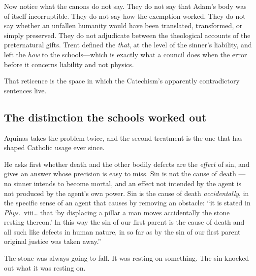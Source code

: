 Now notice what the canons do not say. They do not say that Adam's body was of itself incorruptible. They do not say how the exemption worked. They do not say whether an unfallen humanity would have been translated, transformed, or simply preserved. They do not adjudicate between the theological accounts of the preternatural gifts. Trent defined the \emph{that}, at the level of the sinner's liability, and left the \emph{how} to the schools---which is exactly what a council does when the error before it concerns liability and not physics.

That reticence is the space in which the Catechism's apparently contradictory sentences live.

\subsection{The distinction the schools worked out}

Aquinas takes the problem twice, and the second treatment is the one that has shaped Catholic usage ever since.

He asks first whether death and the other bodily defects are the \emph{effect} of sin, and gives an answer whose precision is easy to miss. Sin is not the cause of death ---no sinner intends to become mortal, and an effect not intended by the agent is not produced by the agent's own power. Sin is the cause of death \emph{accidentally}, in the specific sense of an agent that causes by removing an obstacle: ``it is stated in \emph{Phys.}~viii\ldots{} that `by displacing a pillar a man moves accidentally the stone resting thereon.' In this way the sin of our first parent is the cause of death and all such like defects in human nature, in so far as by the sin of our first parent original justice was taken away.''

The stone was always going to fall. It was resting on something. The sin knocked out what it was resting on.

